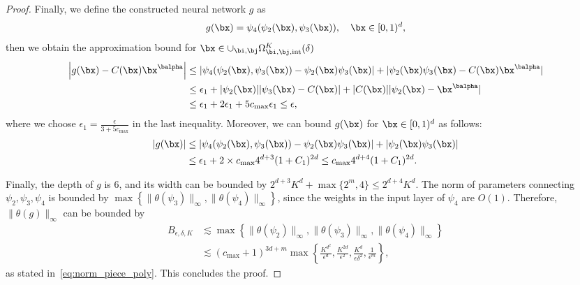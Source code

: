 \documentclass[11pt]{article}
\begin{document}
\begin{proof}
    Finally, we define the constructed neural network $g$ as 
    \begin{equation*}
        g(\bx) = \psi_4(\psi_2(\bx), \psi_3(\bx)), \quad \bx \in [0,1)^d,
    \end{equation*}
    then we obtain the approximation bound for $\bx \in \cup_{\bi, \bj} \Omega_{\bi, \bj, \mathrm{int}}^K(\delta)$
    \begin{equation*}
        \begin{aligned}
            \left|g(\bx)  - C(\bx) \bx^{\balpha}\right| &\leq \left| \psi_4(\psi_2(\bx), \psi_3(\bx)) - \psi_2(\bx) \psi_3(\bx)\right| + |\psi_2(\bx) \psi_3(\bx) - C(\bx) \bx^{\balpha}| \\
            & \leq \epsilon_1 + |\psi_2(\bx)||\psi_3(\bx) - C(\bx)| + |C(\bx)||\psi_2(\bx) - \bx^{\balpha}| \\
            & \leq \epsilon_1 + 2\epsilon_1 + 5c_{\max} \epsilon_1 \leq \epsilon, 
        \end{aligned}
    \end{equation*}
    where we choose $\epsilon_1 = \frac{\epsilon}{3 + 5 c_{\max}}$ in the last inequality. Moreover, we can bound $g(\bx)$ for $\bx \in [0,1)^d$ as follows:
    \begin{equation*}
        \begin{aligned}
            |g(\bx)| & \leq \left| \psi_4(\psi_2(\bx), \psi_3(\bx)) - \psi_2(\bx) \psi_3(\bx)\right| + |\psi_2(\bx) \psi_3(\bx) | \\
            & \leq \epsilon_1 + 2 \times c_{\max} 4^{d+3}(1+C_1)^{2d} \leq c_{\max} 4^{d+4}(1+C_1)^{2d}. 
        \end{aligned}
    \end{equation*}


    Finally, the depth of $g$ is $6$, and its width can be bounded by $2^{d+3}K^d + \max \{2^{m}, 4\} \leq 2^{d+4} K^d$. The norm of parameters connecting $\psi_2, \psi_3, \psi_4$ is bounded by $\max \left\{ \|\theta(\psi_3)\|_{\infty}, \|\theta(\psi_4)\|_{\infty}\right\}$, since the weights in the input layer of $\psi_4$ are $O(1)$. Therefore, $\|\theta(g)\|_{\infty}$ can be bounded by 
    \begin{equation*}
        \begin{aligned}
            B_{\epsilon,\delta, K} & \lesssim \max \left\{ \|\theta(\psi_2)\|_{\infty}, \|\theta(\psi_3)\|_{\infty}, \|\theta(\psi_4)\|_{\infty} \right\}\\
            &\lesssim (c_{\max}+ 1)^{3d+m} \max \left\{ \frac{K^{d^2}}{\epsilon^d}, \frac{K^{2d}}{\epsilon^{2}}, \frac{K^d}{\epsilon \delta^2}, \frac{1}{\epsilon^m} \right\},
        \end{aligned}
    \end{equation*}
    as stated in~\eqref{eq:norm_piece_poly}. This concludes the proof.
\end{proof}
\end{document}
